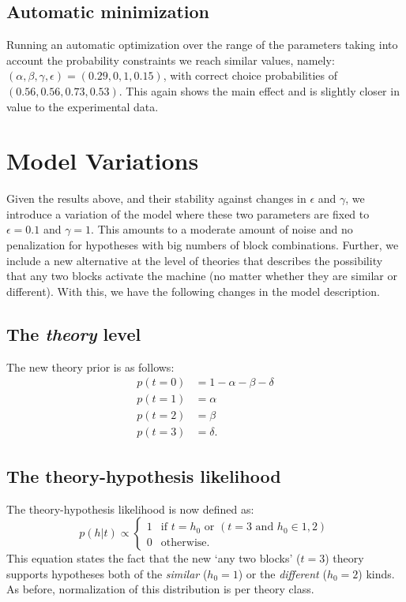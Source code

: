 \documentclass[11pt, a4paper]{article}
\begin{document}
 
 
\subsection*{Automatic minimization}
Running an automatic optimization over the range of the parameters taking into account the probability constraints we reach similar values, namely: $(\alpha,\beta,\gamma,\epsilon)=(0.29,0,1,0.15)$, with correct choice probabilities of $(0.56, 0.56, 0.73, 0.53)$. This again shows the main effect and is slightly closer in value to the experimental data. 
 
 
\section*{Model Variations}
Given the results above, and their stability against changes in $\epsilon$ and $\gamma$, we introduce a variation of the model where these two parameters are fixed to $\epsilon=0.1$ and $\gamma=1$. This amounts to a moderate amount of noise and no penalization for hypotheses with big numbers of block combinations. Further, we include a new alternative at the level of theories that describes the possibility that any two blocks activate the machine (no matter whether they are similar or different). With this, we have the following changes in the model description.
 
\subsection*{The \emph{theory} level}
The new theory prior is as follows:
\begin{equation}
\begin{split}
p(t=0)&=1-\alpha-\beta-\delta\\
p(t=1)&=\alpha\\
p(t=2)&=\beta\\
p(t=3)&=\delta.
\end{split} 
\end{equation}
 
\subsection*{The theory-hypothesis likelihood}
The theory-hypothesis likelihood is now defined as:
\begin{equation}
p(h|t) \propto
\begin{cases}
1 & \mbox{if } t=h_0 \textrm{ or } (t=3 \textrm{ and } h_0\in{1,2}) \\ 
0 & \mbox{otherwise}.
\end{cases}
\end{equation}
This equation states the fact that the new `any two blocks' ($t=3$) theory supports hypotheses both of the \emph{similar} ($h_0=1$) or the \emph{different} ($h_0=2$) kinds. As before, normalization of this distribution is per theory class.
 
\end{document}
